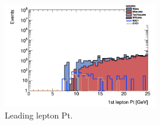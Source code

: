 \documentclass[tightenline,notitlepage,nofootinbib]{revtex4-1}
\begin{document}
\begin{figure}
  \includegraphics[width=0.6\textwidth]{h_PtMuons1st_cuts.png}
  \caption{Leading lepton Pt.}
\end{figure}

     
  
  
  
  
  \clearpage
  {}
%  
  
  
  
\end{document}

